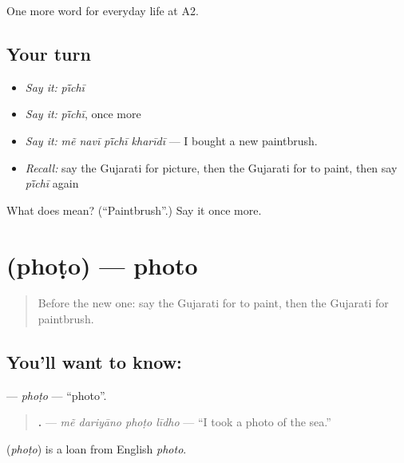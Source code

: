 \begin{grammarlens}[title={What you've built}]
One more word for everyday life at A2.
\end{grammarlens}

\subsection*{Your turn}
\begin{itemize}
\raggedright
  \item \emph{Say it:} \emph{pī̃chī}
  \item \emph{Say it:} \emph{pī̃chī}, once more
  \item \emph{Say it:} \emph{mẽ navī pī̃chī kharīdī} — I bought a new paintbrush.
  \item \emph{Recall:} say the Gujarati for picture, then the Gujarati for to paint, then say \emph{pī̃chī} again
\end{itemize}

\begin{tcolorbox}[breakable,colback=teal!4,colframe=teal!35!black,title={Before you move on}]
What does  mean? (\textquotedblleft{}Paintbrush\textquotedblright{}.) Say it once more.
\end{tcolorbox}
\section[\texorpdfstring{\gu{ફોટો} (phoṭo)}{ફોટો (phoṭo)}]{ (phoṭo) — photo}

\label{lesson:GU-C256-photo}



\begin{quote}
Before the new one: say the Gujarati for to paint, then the Gujarati for paintbrush.
\end{quote}

\subsection*{You'll want to know: }
\textbf{} — \emph{phoṭo} — \textquotedblleft{}photo\textquotedblright{}.

\begin{quote}
\textbf{   .} — \emph{mẽ dariyāno phoṭo līdho} — \textquotedblleft{}I took a photo of the sea.\textquotedblright{}
\end{quote}

\begin{cousinweb}
\textbf{} (\emph{phoṭo}) is a loan from English \emph{photo}.
\end{cousinweb}

